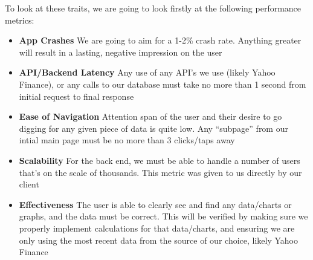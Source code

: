 \documentclass[letterpaper,10pt]{article}
\begin{document}
To look at these traits, we are going to look firstly at the following performance metrics:
\begin{itemize}
\item \textbf{App Crashes}  We are going to aim for a 1-2\% crash rate. Anything greater will result in a lasting, negative impression on the user
\item \textbf{API/Backend Latency}  Any use of any API’s we use (likely Yahoo Finance), or any calls to our database must take no more than 1 second from initial request to final response
\item \textbf{Ease of Navigation} Attention span of the user and their desire to go digging for any given piece of data is quite low. Any “subpage” from our intial main page must be no more than 3 clicks/taps away
\item \textbf{Scalability}  For the back end, we must be able to handle a number of users that's on the scale of thousands. This metric was given to us directly by our client
\item \textbf{Effectiveness}  The user is able to clearly see and find any data/charts or graphs, and the data must be correct. This will be verified by making sure we properly implement calculations for that data/charts, and ensuring we are only using the most recent data from the source of our choice, likely Yahoo Finance
\end{itemize}
\end{document}
